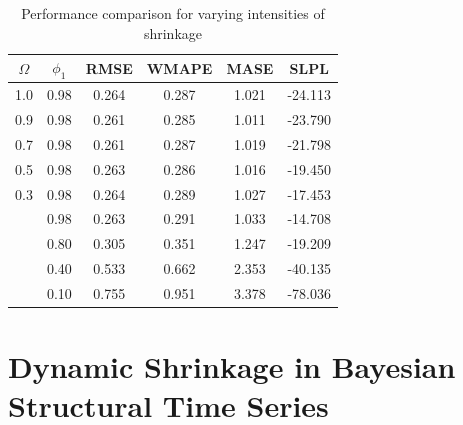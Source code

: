\documentclass[
  12pt,
]{book}
\theoremstyle{break}
\theoremstyle{nonumberplain}
\begin{document}
\begin{table}[H]

\caption{\label{tab:mytab001}Performance comparison for varying intensities of shrinkage}
\centering
\begin{tabular}[t]{cccccc}
\toprule
$\Omega$ & $\phi_1$ & RMSE & WMAPE & MASE & SLPL\\
\midrule
1.0 & 0.98 & 0.264 & 0.287 & 1.021 & -24.113\\
\cmidrule{1-6}
0.9 & 0.98 & 0.261 & 0.285 & 1.011 & -23.790\\
\cmidrule{1-6}
0.7 & 0.98 & 0.261 & 0.287 & 1.019 & -21.798\\
\cmidrule{1-6}
0.5 & 0.98 & 0.263 & 0.286 & 1.016 & -19.450\\
\cmidrule{1-6}
0.3 & 0.98 & 0.264 & 0.289 & 1.027 & -17.453\\
\cmidrule{1-6}
 & 0.98 & 0.263 & 0.291 & 1.033 & -14.708\\
\cmidrule{2-6}
 & 0.80 & 0.305 & 0.351 & 1.247 & -19.209\\
\cmidrule{2-6}
 & 0.40 & 0.533 & 0.662 & 2.353 & -40.135\\
\cmidrule{2-6}
\multirow[t]{-4}{*}{\centering\arraybackslash 0.1} & 0.10 & 0.755 & 0.951 & 3.378 & -78.036\\
\bottomrule
\end{tabular}
\end{table}

\chapter[Bayesian Structural Time Series]{Dynamic Shrinkage in Bayesian Structural Time Series}\label{Dynamic Shrinkage in Bayesian Structural Time Series}
\end{document}
